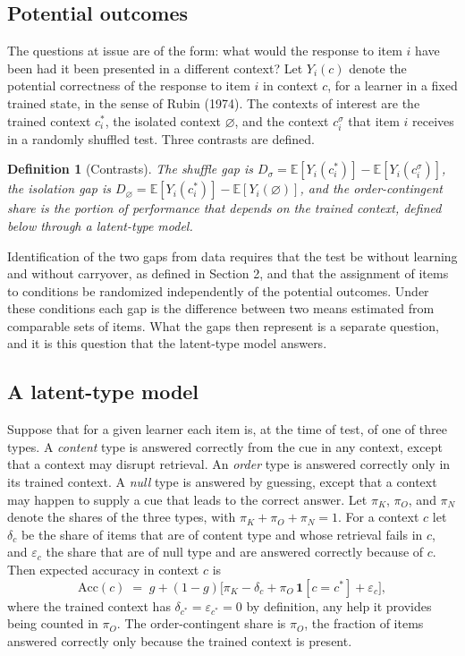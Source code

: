 \documentclass[11pt]{article}
\newtheorem{definition}{Definition}
\theoremstyle{remark}
\newcommand{\E}{\mathbb{E}}
\begin{document}
\subsection{Potential outcomes}

The questions at issue are of the form: what would the response to item $i$ have been had it been presented in a different context? Let $Y_i(c)$ denote the potential correctness of the response to item $i$ in context $c$, for a learner in a fixed trained state, in the sense of Rubin (1974). The contexts of interest are the trained context $c^\ast_i$, the isolated context $\varnothing$, and the context $c^\sigma_i$ that item $i$ receives in a randomly shuffled test. Three contrasts are defined.

\begin{definition}[Contrasts]
The \emph{shuffle gap} is $D_\sigma = \E[Y_i(c^\ast_i)] - \E[Y_i(c^\sigma_i)]$, the \emph{isolation gap} is $D_\varnothing = \E[Y_i(c^\ast_i)] - \E[Y_i(\varnothing)]$, and the \emph{order-contingent share} is the portion of performance that depends on the trained context, defined below through a latent-type model.
\end{definition}

Identification of the two gaps from data requires that the test be without learning and without carryover, as defined in Section 2, and that the assignment of items to conditions be randomized independently of the potential outcomes. Under these conditions each gap is the difference between two means estimated from comparable sets of items. What the gaps then represent is a separate question, and it is this question that the latent-type model answers.

\subsection{A latent-type model}

Suppose that for a given learner each item is, at the time of test, of one of three types. A \emph{content} type is answered correctly from the cue in any context, except that a context may disrupt retrieval. An \emph{order} type is answered correctly only in its trained context. A \emph{null} type is answered by guessing, except that a context may happen to supply a cue that leads to the correct answer. Let $\pi_K$, $\pi_O$, and $\pi_N$ denote the shares of the three types, with $\pi_K+\pi_O+\pi_N=1$. For a context $c$ let $\delta_c$ be the share of items that are of content type and whose retrieval fails in $c$, and $\varepsilon_c$ the share that are of null type and are answered correctly because of $c$. Then expected accuracy in context $c$ is
\[
\mathrm{Acc}(c) \;=\; g + (1-g)\bigl[\pi_K - \delta_c + \pi_O\,\mathbf 1[c=c^\ast] + \varepsilon_c\bigr],
\]
where the trained context has $\delta_{c^\ast}=\varepsilon_{c^\ast}=0$ by definition, any help it provides being counted in $\pi_O$. The order-contingent share is $\pi_O$, the fraction of items answered correctly only because the trained context is present.
\end{document}
